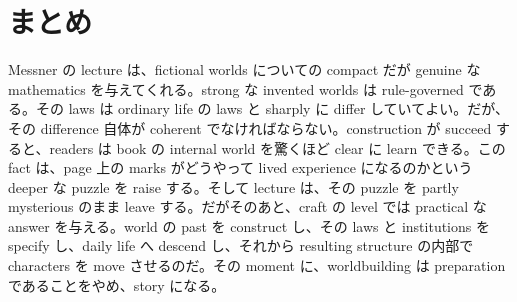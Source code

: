 \section{まとめ}

Messner の lecture は、fictional worlds についての compact だが genuine な mathematics を与えてくれる。strong な invented worlds は rule-governed である。その laws は ordinary life の laws と sharply に differ していてよい。だが、その difference 自体が coherent でなければならない。construction が succeed すると、readers は book の internal world を驚くほど clear に learn できる。この fact は、page 上の marks がどうやって lived experience になるのかという deeper な puzzle を raise する。そして lecture は、その puzzle を partly mysterious のまま leave する。だがそのあと、craft の level では practical な answer を与える。world の past を construct し、その laws と institutions を specify し、daily life へ descend し、それから resulting structure の内部で characters を move させるのだ。その moment に、worldbuilding は preparation であることをやめ、story になる。